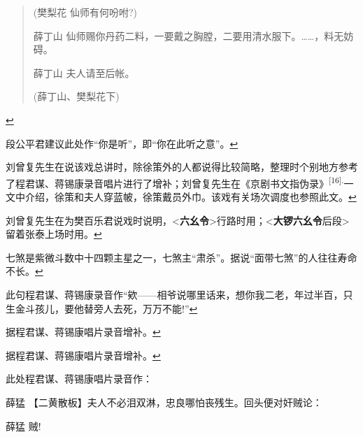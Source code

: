   \begin{quote}
  (樊梨花 仙师有何吩咐?)

  薛丁山
  仙师赐你丹药二料，一要戴之胸膛，二要用清水服下。\ldots{}\ldots{}，料无妨碍。

  薛丁山 夫人请至后帐。

  (薛丁山、樊梨花下)
  \end{quote}

  \protect\hyperlink{fnref363}{↩}
\item
  \leavevmode\hypertarget{fn364}{}%
  段公平君建议此处作``你是听''，即``你在此听之意''。\protect\hyperlink{fnref364}{↩}
\item
  \leavevmode\hypertarget{fn365}{}%
  刘曾复先生在说该戏总讲时，除徐策外的人都说得比较简略，整理时个别地方参考了程君谋、蒋锡康录音唱片进行了增补；刘曾复先生在《京剧书文指伪录》\textsuperscript{{[}16{]}.}一文中介绍，徐策和夫人穿蓝帔，徐策戴员外巾。该戏有关场次调度也参照此文。\protect\hyperlink{fnref365}{↩}
\item
  \leavevmode\hypertarget{fn366}{}%
  刘曾复先生在为樊百乐君说戏时说明，\textless{}\textbf{六幺令}\textgreater{}行路时用；\textless{}\textbf{大锣六幺令}后段\textgreater{}留着张泰上场时用。\protect\hyperlink{fnref366}{↩}
\item
  \leavevmode\hypertarget{fn367}{}%
  七煞是紫微斗数中十四颗主星之一，七煞主``肃杀''。据说``面带七煞''的人往往寿命不长。\protect\hyperlink{fnref367}{↩}
\item
  \leavevmode\hypertarget{fn368}{}%
  此句程君谋、蒋锡康录音作``欸------相爷说哪里话来，想你我二老，年过半百，只生金斗孩儿，要他替旁人去死，万万不能!''\protect\hyperlink{fnref368}{↩}
\item
  \leavevmode\hypertarget{fn369}{}%
  据程君谋、蒋锡康唱片录音增补。\protect\hyperlink{fnref369}{↩}
\item
  \leavevmode\hypertarget{fn370}{}%
  据程君谋、蒋锡康唱片录音增补。\protect\hyperlink{fnref370}{↩}
\item
  \leavevmode\hypertarget{fn371}{}%
  此处程君谋、蒋锡康唱片录音作：

  薛猛 【二黄散板】夫人不必泪双淋，忠良哪怕丧残生。回头便对奸贼论：

  薛猛 贼!

